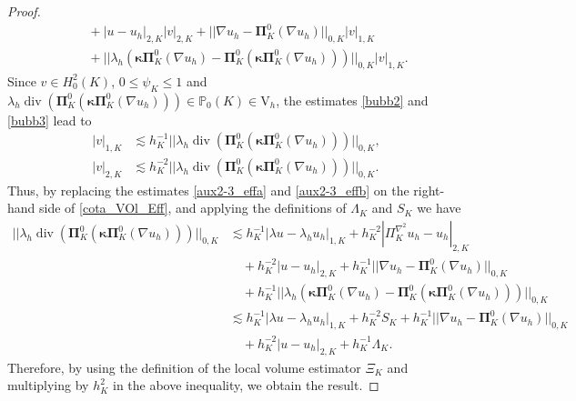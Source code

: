 \documentclass[final,reqno]{elsarticle}
\newcommand\vdiv{\mathop{\mathrm{div}}\nolimits}
\def\bkappa{\boldsymbol{\kappa}}
\def\bPi{\mathbf{\Pi}}
\def\rV{\mathrm{V}}
\begin{document}
\begin{proof}
\begin{align}
       &\quad + |u-u_h|_{2,K}|v|_{2,K} + ||\nabla u_h - \bPi_K^0 (\nabla u_h)||_{0,K}|v|_{1,K}\nonumber\\
       &\quad + ||\lambda_h \left(\bkappa \bPi_K^0(\nabla u_h)-\bPi_K^0(\bkappa \bPi_K^0(\nabla u_h))\right) ||_{0,K}|v|_{1,K}.\label{cota_VOl_Eff}
    \end{align}
Since $v\in H_0^2(K)$, $0\leq \psi_K\leq 1$ and  $\lambda_h \vdiv\left( \bPi_K^0 (\bkappa \bPi_K^0(\nabla u_h))\right) \in \mathbb{P}_0(K)\in \rV_h$, the estimates \eqref{bubb2} and \eqref{bubb3} lead to 
\begin{subequations}
    \begin{align}
        |v|_{1,K} &\lesssim h_K^{-1}||\lambda_h \vdiv\left( \bPi_K^0 (\bkappa \bPi_K^0(\nabla u_h))\right) ||_{0,K}, \label{aux2-3_effa}\\ 
        |v|_{2,K} &\lesssim  h_K^{-2} ||\lambda_h \vdiv\left( \bPi_K^0 (\bkappa \bPi_K^0(\nabla u_h))\right) ||_{0,K}.\label{aux2-3_effb}
    \end{align}
\end{subequations}
Thus, by replacing the estimates \eqref{aux2-3_effa} and \eqref{aux2-3_effb} on the right-hand side of \eqref{cota_VOl_Eff}, and applying the definitions of $\Lambda_K$ and $S_K$ we have
\begin{align}    
||\lambda_h \vdiv\left( \bPi_K^0 (\bkappa \bPi_K^0(\nabla u_h))\right) ||_{0,K}
&\lesssim h_K^{-1}|\lambda u-\lambda_h u_h|_{1,K} + h_K^{-2}|\Pi_K^{\nabla^2} u_h-u_h|_{2,K} \nonumber\\
&\quad + h_K^{-2}|u-u_h|_{2,K} + h_K^{-1} ||\nabla u_h - \bPi_K^0 (\nabla u_h)||_{0,K} \nonumber\\
&\quad + h_K^{-1}||\lambda_h \left(\bkappa \bPi_K^0(\nabla u_h)-\bPi_K^0(\bkappa \bPi_K^0(\nabla u_h))\right) ||_{0,K} \nonumber\\
&\lesssim h_K^{-1}|\lambda u-\lambda_h u_h|_{1,K} + h_K^{-2} S_K + h_K^{-1} ||\nabla u_h - \bPi_K^0 (\nabla u_h)||_{0,K} \nonumber\\
&\quad + h_K^{-2}|u-u_h|_{2,K}  + h_K^{-1}\Lambda_K. \nonumber
\end{align}
%
Therefore, by using the definition of the local volume estimator $\Xi_K$ and multiplying by $h_K^{2}$ in the above inequality, we obtain the result.
%

\end{proof}
\end{document}
